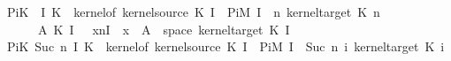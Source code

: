 \begin{isabellebody}
{{\isachardoublequoteopen}PiK\ {}\ I\ K\ {\isacharequal}{\kern0pt}\ kernel{\isacharunderscore}{\kern0pt}of\ {\isacharparenleft}{\kern0pt}kernel{\isacharunderscore}{\kern0pt}source\ {\isacharparenleft}{\kern0pt}K\ {\isacharparenleft}{\kern0pt}I\ {}{\isacharparenright}{\kern0pt}{\isacharparenright}{\kern0pt}{\isacharparenright}{\kern0pt}\ {\isacharparenleft}{\kern0pt}PiM\ {\isacharbraceleft}{\kern0pt}I\ {}{\isacharbraceright}{\kern0pt}\ {\isacharparenleft}{\kern0pt}{\isasymlambda}n{\isachardot}{\kern0pt}\ kernel{\isacharunderscore}{\kern0pt}target\ {\isacharparenleft}{\kern0pt}K\ n{\isacharparenright}{\kern0pt}{\isacharparenright}{\kern0pt}{\isacharparenright}{\kern0pt}\isanewline
\ \ \ {\isacharparenleft}{\kern0pt}{\isasymlambda}\ {\isasymomega}\ A{\isacharprime}{\kern0pt}{\isachardot}{\kern0pt}\ {\isacharparenleft}{\kern0pt}K\ {\isacharparenleft}{\kern0pt}I\ {}{\isacharparenright}{\kern0pt}{\isacharparenright}{\kern0pt}\ {\isasymomega}\ {\isacharparenleft}{\kern0pt}{\isacharparenleft}{\kern0pt}{\isasymlambda}x{\isachardot}{\kern0pt}{\isacharparenleft}{\kern0pt}{\isasymlambda}n{\isasymin}{\isacharbraceleft}{\kern0pt}I\ {}{\isacharbraceright}{\kern0pt}{\isachardot}{\kern0pt}\ x{\isacharparenright}{\kern0pt}{\isacharparenright}{\kern0pt}\ {\isacharminus}{\kern0pt}{\isacharbackquote}{\kern0pt}\ A{\isacharprime}{\kern0pt}\ {\isasyminter}\ space\ {\isacharparenleft}{\kern0pt}kernel{\isacharunderscore}{\kern0pt}target\ {\isacharparenleft}{\kern0pt}K\ {\isacharparenleft}{\kern0pt}I\ {}{\isacharparenright}{\kern0pt}{\isacharparenright}{\kern0pt}{\isacharparenright}{\kern0pt}{\isacharparenright}{\kern0pt}{\isacharparenright}{\kern0pt}{\isachardoublequoteclose}\ {\isacharbar}{\kern0pt}\isanewline
{\isachardoublequoteopen}PiK\ {\isacharparenleft}{\kern0pt}Suc\ n{\isacharparenright}{\kern0pt}\ I\ K\ {\isacharequal}{\kern0pt}\ kernel{\isacharunderscore}{\kern0pt}of\ {\isacharparenleft}{\kern0pt}kernel{\isacharunderscore}{\kern0pt}source\ {\isacharparenleft}{\kern0pt}K\ {\isacharparenleft}{\kern0pt}I\ {}{\isacharparenright}{\kern0pt}{\isacharparenright}{\kern0pt}{\isacharparenright}{\kern0pt}\ {\isacharparenleft}{\kern0pt}PiM\ {\isacharparenleft}{\kern0pt}I\ {\isacharbackquote}{\kern0pt}\ {\isacharbraceleft}{\kern0pt}{}{\isachardot}{\kern0pt}{\isachardot}{\kern0pt}Suc\ n{\isacharbraceright}{\kern0pt}{\isacharparenright}{\kern0pt}\ {\isacharparenleft}{\kern0pt}{\isasymlambda}i{\isachardot}{\kern0pt}\ kernel{\isacharunderscore}{\kern0pt}target\ {\isacharparenleft}{\kern0pt}K\ i{\isacharparenright}{\kern0pt}{\isacharparenright}{\kern0pt}{\isacharparenright}{\kern0pt}\isanewline
}
\end{isabellebody}
